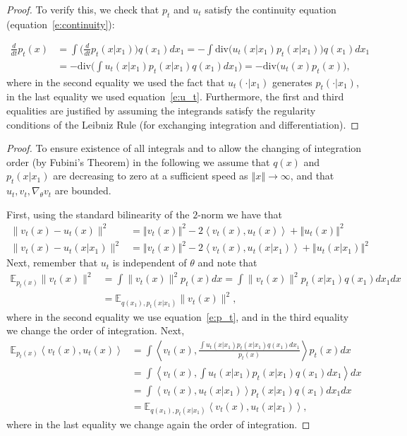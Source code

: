 \documentclass{article}
\newcommand{\norm}[1]{\left\Vert#1\right\Vert}
\newcommand{\ip}[1]{\left \langle #1 \right \rangle }
\newcommand{\too}{\rightarrow}
\def\eqref#1{equation~\ref{#1}}
\newcommand{\E}{\mathbb{E}}
\begin{document}
\marginalvf*
\begin{proof}
To verify this, we check that $p_t$ and $u_t$ satisfy the continuity equation (\eqref{e:continuity}):

\begin{align*}
    \frac{d}{dt}p_t(x) &= \int \Big( \frac{d}{dt} p_t(x\vert x_1)  \Big) q(x_1) dx_1 = -\int \mathrm{div}\Big(   u_t(x\vert x_1)p_t(x\vert x_1)  \Big) q(x_1) dx_1 \\
    &= -\mathrm{div}\Big(\int    u_t(x\vert x_1)p_t(x\vert x_1)   q(x_1) dx_1\Big) = -\mathrm{div} \Big( u_t(x) p_t(x) \Big ),
\end{align*}
where in the second equality we used the fact that $u_t(\cdot\vert x_1)$ generates $p_t(\cdot\vert x_1)$, in the last equality we used \eqref{e:u_t}. Furthermore, the first and third equalities are justified by assuming the integrands satisfy the regularity conditions of the Leibniz Rule (for exchanging integration and differentiation).
\end{proof}

\cfm*
\begin{proof}
To ensure existence of all integrals and to allow the changing of integration order (by Fubini's Theorem) in the following we assume that $q(x)$ and $p_t(x|x_1)$ are decreasing to zero at a sufficient speed as $\norm{x}\too \infty$, and that $u_t,v_t,\nabla_\theta v_t$ are bounded.

First, using the standard bilinearity of the $2$-norm we have that 
\begin{align*}
    \|v_t(x)-u_t(x)\|^2 &= \norm{v_t(x)}^2 - 2\ip{v_t(x),u_t(x)} + \norm{u_t(x)}^2 \\
    \|v_t(x)-u_t(x\vert x_1)\|^2  &= \norm{v_t(x)}^2 - 2\ip{v_t(x),u_t(x\vert x_1)} + \norm{u_t(x\vert x_1)}^2
\end{align*}
Next, remember that $u_t$ is independent of $\theta$ and note that 
\begin{align*}
    \E_{p_t(x)} \|v_t(x)\|^2 &= \int \|v_t(x)\|^2 p_t(x) dx = \int \|v_t(x)\|^2 p_t(x\vert x_1)q(x_1) dx_1 dx \\ &= \E_{q(x_1),p_t(x\vert x_1)}\|v_t(x)\|^2,
\end{align*}
where in the second equality we use \eqref{e:p_t}, and in the third equality we change the order of integration.  
Next,
\begin{align*}
    \E_{p_t(x)}\ip{v_t(x),u_t(x)} &= \int\ip{v_t(x),\frac{\int u_t(x\vert x_1) p_t(x\vert x_1)q(x_1)dx_1}{p_t(x)}}p_t(x)dx \\
    &=
    \int\ip{v_t(x),\int u_t(x\vert x_1) p_t(x\vert x_1)q(x_1)dx_1}dx \\
    &= 
    \int\ip{v_t(x), u_t(x\vert x_1) }p_t(x\vert x_1)q(x_1)dx_1dx \\
    &= \E_{q(x_1),p_t(x\vert x_1)} \ip{v_t(x), u_t(x\vert x_1) },
\end{align*}
where in the last equality we change again the order of integration. 
\end{proof}
\end{document}
